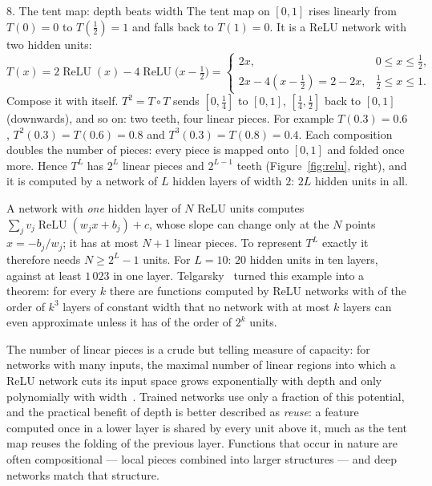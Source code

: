 \documentclass[11pt]{article}
\newcommand{\relu}{\operatorname{ReLU}}
\begin{document}
\begin{worked}{8. The tent map: depth beats width}
The tent map on $[0, 1]$ rises linearly from $T(0) = 0$ to $T(\frac12) = 1$ and falls back to $T(1) = 0$. It is a
ReLU network with two hidden units:
\[
  T(x) = 2\relu(x) - 4\relu\big(x - \tfrac12\big) =
  \begin{cases} 2x, & 0 \le x \le \frac12 , \\ 2x - 4(x - \frac12) = 2 - 2x, & \frac12 \le x \le 1 . \end{cases}
\]
Compose it with itself. $T^2 = T \circ T$ sends $[0, \frac14]$ to $[0, 1]$, $[\frac14, \frac12]$ back to $[0, 1]$
(downwards), and so on: two teeth, four linear pieces. For example $T(0.3) = 0.6$, $T^2(0.3) = T(0.6) = 0.8$ and
$T^3(0.3) = T(0.8) = 0.4$. Each composition doubles the number of pieces: every piece is mapped onto $[0, 1]$ and
folded once more. Hence $T^L$ has $2^L$ linear pieces and $2^{L-1}$ teeth
(Figure~\ref{fig:relu}, right), and it is computed by a network of $L$ hidden layers of width $2$: $2L$ hidden units in
all.

A network with \emph{one} hidden layer of $N$ ReLU units computes $\sum_j v_j\relu(w_jx + b_j) + c$, whose slope can
change only at the $N$ points $x = -b_j/w_j$; it has at most $N + 1$ linear pieces. To represent $T^L$ exactly it
therefore needs $N \ge 2^L - 1$ units. For $L = 10$: $20$ hidden units in ten layers, against at least $1\,023$ in one
layer. Telgarsky~\cite{telgarsky2016} turned this example into a theorem: for every $k$ there are functions computed by ReLU
networks with of the order of $k^3$ layers of constant width that no network with at most $k$ layers can even
approximate unless it has of the order of $2^k$ units.
\end{worked}

The number of linear pieces is a crude but telling measure of capacity: for networks with many inputs, the maximal
number of linear regions into which a ReLU network cuts its input space grows exponentially with depth and only
polynomially with width~\cite{montufar2014}. Trained networks use only a fraction of this potential, and the practical
benefit of depth is better described as \emph{reuse}: a feature computed once in a lower layer is shared by every unit
above it, much as the tent map reuses the folding of the previous layer. Functions that occur in nature are often
compositional --- local pieces combined into larger structures --- and deep networks match that structure.
\end{document}

